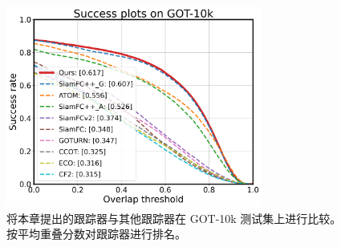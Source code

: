 \begin{figure}[t]
    \centering
    \includegraphics[width=0.75\textwidth]{Img/MTP/got10k/success_plot.png}
    \caption{将本章提出的跟踪器与其他跟踪器在 GOT-10k 测试集上进行比较。按平均重叠分数对跟踪器进行排名。}
    \label{fig:got10k}
\end{figure}

